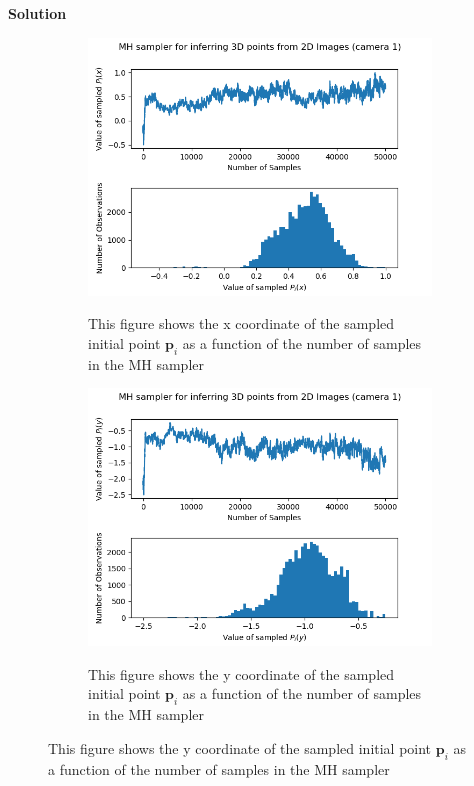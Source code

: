 \documentclass[10pt]{article}
\begin{document}
\begin{enumerate}
{\bf Solution}

\begin{figure}[h!]
\centering
\begin{subfigure}[]{.320\textwidth}
  \centering
  \includegraphics[width=1\linewidth]{figures/p_i_x.png}
  \label{fig:t2pix}
\caption{This figure shows the x coordinate of the sampled initial point $\mathbf{p}_i$ as a function of the number of samples in the MH sampler}
\end{subfigure}
\begin{subfigure}[]{.320\textwidth}
  \centering
  \includegraphics[width=1\linewidth]{figures/p_i_y.png}
  \label{fig:t2piy}
\caption{This figure shows the y coordinate of the sampled initial point $\mathbf{p}_i$ as a function of the number of samples in the MH sampler}

\end{subfigure}
\end{figure}
\end{enumerate}
\end{document}
